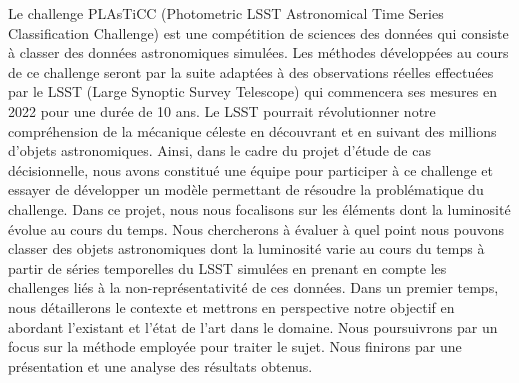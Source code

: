 Le challenge PLAsTiCC (Photometric LSST Astronomical Time Series Classification Challenge) est une compétition de sciences des données qui consiste à classer des données astronomiques simulées. Les méthodes développées au cours de ce challenge seront par la suite adaptées à des observations réelles effectuées par le LSST (Large Synoptic Survey Telescope) qui commencera ses mesures en 2022 pour une durée de 10 ans. Le LSST pourrait révolutionner notre compréhension de la mécanique céleste en découvrant et en suivant des millions d’objets astronomiques.
\newline
Ainsi, dans le cadre du projet d’étude de cas décisionnelle, nous avons constitué une
équipe pour participer à ce challenge et essayer de développer un modèle permettant de
résoudre la problématique du challenge.
\newline
Dans ce projet, nous nous focalisons sur les éléments dont la luminosité évolue au cours du temps. Nous chercherons à évaluer à quel point nous pouvons classer des objets astronomiques dont la luminosité varie au cours du temps à partir de séries temporelles du LSST simulées en prenant en compte les challenges liés à la non-représentativité de ces données. Dans un premier temps, nous détaillerons le contexte et mettrons en perspective notre objectif en abordant l’existant et l’état de l’art dans le domaine. Nous poursuivrons par un focus sur la méthode employée pour traiter le sujet. Nous finirons par une présentation et une analyse des résultats obtenus. 
